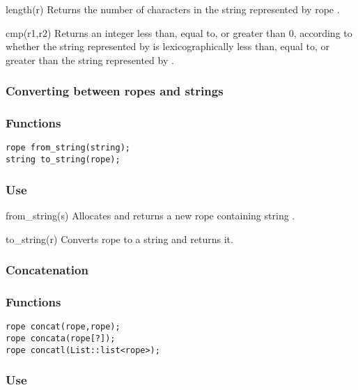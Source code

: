 \begin{defun}{length}{(r)}
Returns the number of characters in the string represented by rope
.
\end{defun}

\begin{defun}{cmp}{(r1,r2)}
Returns an integer less than, equal to, or greater than 0, according to
whether the string represented by  is lexicographically less
than, equal to, or greater than the string represented by .
\end{defun}

\subsubsection*{Converting between ropes and strings}
\subsubsection*{Functions}
\begin{verbatim}
rope from_string(string);
string to_string(rope);
\end{verbatim}

\subsubsection*{Use}

\begin{defun}{from_string}{(s)}
Allocates and returns a new rope containing string .
\end{defun}

\begin{defun}{to_string}{(r)}
Converts rope  to a string and returns it.
\end{defun}

\subsubsection*{Concatenation}
\subsubsection*{Functions}
\begin{verbatim}
rope concat(rope,rope);
rope concata(rope[?]);
rope concatl(List::list<rope>);
\end{verbatim}

\subsubsection*{Use}

